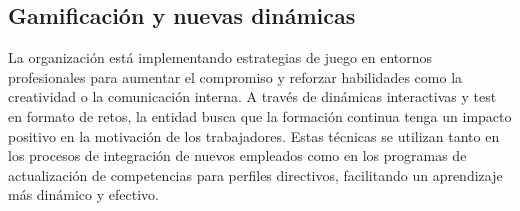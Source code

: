 \subsection{Gamificación y nuevas dinámicas}

La organización está implementando estrategias de juego en entornos profesionales para aumentar el compromiso y reforzar habilidades como la creatividad o la comunicación interna. A través de dinámicas interactivas y test en formato de retos, la entidad busca que la formación continua tenga un impacto positivo en la motivación de los trabajadores. Estas técnicas se utilizan tanto en los procesos de integración de nuevos empleados como en los programas de actualización de competencias para perfiles directivos, facilitando un aprendizaje más dinámico y efectivo.